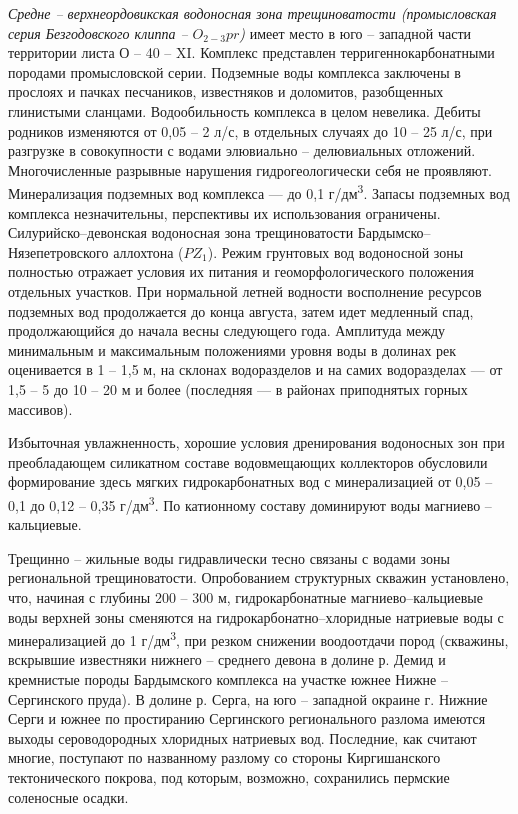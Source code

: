 \textit{Средне -- верхнеордовикская водоносная зона трещиноватости (промысловская серия Безгодовского клиппа  --  $O_{2-3}pr$)} имеет место в юго -- западной части территории листа О -- 40 -- XI. Комплекс представлен терригеннокарбонатными породами промысловской серии. Подземные воды комплекса заключены в прослоях и пачках песчаников, известняков и доломитов, разобщенных глинистыми сланцами. Водообильность комплекса в целом невелика. Дебиты родников изменяются от 0,05 -- 2 л/с, в отдельных случаях до 10 -- 25 л/с, при разгрузке в совокупности с водами элювиально -- делювиальных
отложений. Многочисленные разрывные нарушения гидрогеологически себя не проявляют. Минерализация подземных вод комплекса  ---  до 0,1 г/дм\textsuperscript{3}. Запасы подземных вод комплекса незначительны, перспективы их использования ограничены.
Силурийско--девонская водоносная зона трещиноватости Бардымско--Нязепетровского аллохтона ($PZ_1$). Режим грунтовых вод водоносной зоны
полностью отражает условия их питания и геоморфологического положения отдельных участков. При нормальной летней водности восполнение
ресурсов подземных вод продолжается до конца августа, затем идет медленный спад, продолжающийся до начала весны следующего года. Амплитуда
между минимальным и максимальным положениями уровня воды в долинах рек оценивается в 1 -- 1,5 м, на склонах водоразделов и на самих водоразделах ---  от 1,5 -- 5 до 10 -- 20 м и более (последняя  ---  в районах приподнятых горных массивов).

Избыточная увлажненность, хорошие условия дренирования водоносных зон при преобладающем силикатном составе водовмещающих коллекторов
обусловили формирование здесь мягких гидрокарбонатных вод с минерализацией от 0,05 -- 0,1 до 0,12 -- 0,35 г/дм\textsuperscript{3}. По катионному составу доминируют воды магниево -- кальциевые.

Трещинно -- жильные воды гидравлически тесно связаны с водами зоны региональной трещиноватости. Опробованием структурных скважин установлено, что, начиная с глубины 200 -- 300 м, гидрокарбонатные магниево--кальциевые воды верхней зоны сменяются на гидрокарбонатно--хлоридные
натриевые воды с минерализацией до 1 г/дм\textsuperscript{3}, при резком снижении воодоотдачи пород (скважины, вскрывшие известняки нижнего -- среднего девона в долине р. Демид и кремнистые породы Бардымского комплекса на участке южнее Нижне -- Сергинского пруда).
В долине р. Серга, на юго -- западной окраине г. Нижние Серги и южнее по простиранию Сергинского регионального разлома имеются выходы сероводородных хлоридных натриевых вод. Последние, как считают многие, поступают по названному разлому со стороны Киргишанского тектонического покрова, под которым, возможно, сохранились пермские соленосные осадки.


